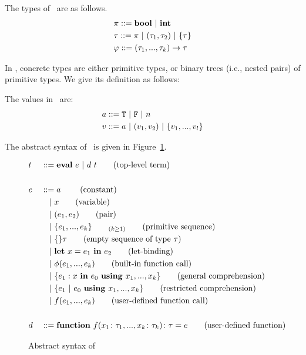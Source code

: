 The types of \mysnesl \ are as follows.
\begin{align*} 
& \pi ::= \mathbf{bool} \ | \ \mathbf{int} \\
& \tau ::= \pi \ | \ (\tau_1,\tau_2) \ | \ \{\tau\}  \\
& \varphi :: = (\tau_1,...,\tau_k) \rightarrow \tau 
\end{align*}

In \mysnesl, concrete types are either primitive types, or binary trees (i.e., nested pairs) of primitive types. 
We give its definition as follows:


The values in \mysnesl \ are:
\begin{align*}
& a ::=  \mathtt{T} \ | \ \mathtt{F} \ | \ n  \\
& v ::=  a \ | \ (v_1,v_2) \ | \ \{v_1,...,v_l\} 
\end{align*}

The abstract syntax of \mysnesl \ is given in Figure~\ref{fig-mysnesl}. 
 

\begin{figure}[H]\large
	\begin{alignat*}{2}
	& t &&::= \mathbf{eval} \ e \ | \ d \ t  \tag{top-level term} \\
	\\
	& e &&::=  a \     \tag{constant} \\
	&   && \quad | \ x  \tag{variable} \\
	&   && \quad | \ (e_1,e_2) \tag{pair}\\
	&   && \quad | \ \{e_1,...,e_k \}_{\qquad (k \ge 1)}	\tag{primitive sequence} \\
	&   && \quad | \ \{ \}\tau			\tag{empty sequence of type $\tau$} \\
	&   && \quad | \ \mathbf{let} \ x = e_1 \ \mathbf{in} \ e_2 \tag{let-binding}\\
	&   && \quad | \ \phi{(e_1,...,e_k)}  \tag{built-in function call} \\
	&   && \quad | \ \{e_1 : x \ \mathbf{in} \ e_0 \ \mathbf{using} \ x_1,...,x_k\} \tag{general comprehension} \\
	&   && \quad | \ \{ e_1 \ | \ e_0 \ \mathbf{using} \ x_1,...,x_k \} \tag {restricted comprehension} \\
	&   && \quad | \ f(e_1,...,e_k)  \tag {user-defined function call} \\
	\\
	& d &&::= \mathbf{function} \  f(x_1\colon{\tau_1}, ..., x_k\colon\tau_k)\colon{\tau} = e  \tag{user-defined function}
	\end{alignat*}
	\caption{Abstract syntax of \mysnesl \ \label{fig-mysnesl}}
\end{figure}

